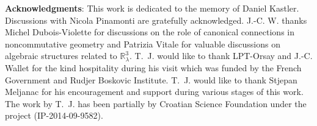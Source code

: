 \documentclass[a4paper,11pt,twoside]{article}
\numberwithin{equation}{section}
\theoremstyle{nonumberplain}
\newcounter{and}
\begin{document}
\vspace*{40pt}\noindent\textbf{Acknowledgments}: This work is dedicated to the memory of Daniel Kastler. Discussions with Nicola Pinamonti are gratefully acknowledged. J.-C. W. thanks Michel Dubois-Violette for discussions on the role of canonical connections in noncommutative geometry and Patrizia Vitale for valuable discussions on algebraic structures related to $\mathbb{R}^3_\lambda$. T.~J. would like to thank LPT-Orsay and J.-C. Wallet for the kind hospitality during his visit which was funded by the French Government and Rudjer Boskovic Institute. T.~J. would like to thank Stjepan Meljanac for his encouragement and support during various stages of this work. The work by T.~J. has been partially  by Croatian Science Foundation under the project (IP-2014-09-9582).

\setcounter{section}{0}
\appendix
\end{document}
